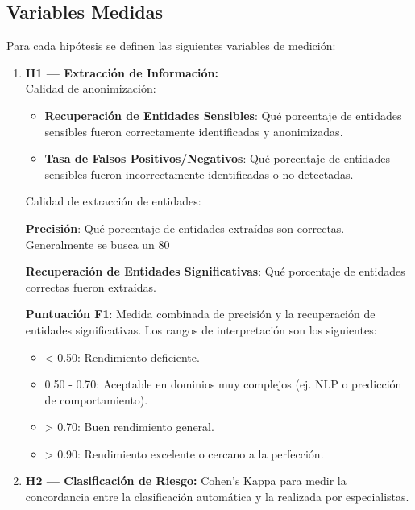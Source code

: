 \documentclass[12pt]{article}
\begin{document}
\subsection{Variables Medidas}

Para cada hipótesis se definen las siguientes variables de medición:

\begin{enumerate}


    \item \textbf{H1 — Extracción de Información:}\\
    Calidad de anonimización:
    \begin{itemize}
        \item \textbf{Recuperación de Entidades Sensibles}: Qué porcentaje de entidades sensibles fueron correctamente identificadas y anonimizadas.
        \item \textbf{Tasa de Falsos Positivos/Negativos}: Qué porcentaje de entidades sensibles fueron incorrectamente identificadas o no detectadas.
    \end{itemize}
    Calidad de extracción de entidades:

    \textbf{Precisión}: Qué porcentaje de entidades extraídas son correctas. Generalmente se busca un 80%

    \textbf{Recuperación de Entidades Significativas}: Qué porcentaje de entidades correctas fueron extraídas.

    \textbf{Puntuación F1}: Medida combinada de precisión y la recuperación de entidades significativas. Los rangos de interpretación son los siguientes:

    \begin{itemize}
        \item \textless{} 0.50: Rendimiento deficiente.
        \item 0.50 - 0.70: Aceptable en dominios muy complejos (ej. NLP o predicción de comportamiento).
        \item \textgreater{} 0.70: Buen rendimiento general.
        \item \textgreater{} 0.90: Rendimiento excelente o cercano a la perfección.
    \end{itemize}


    \item \textbf{H2 — Clasificación de Riesgo:}
    Cohen's Kappa para medir la concordancia entre la clasificación automática y la realizada por especialistas.


\end{enumerate}
\end{document}

